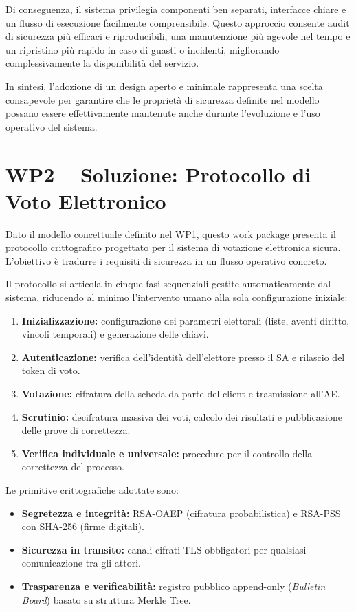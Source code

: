 \documentclass[12pt,a4paper]{article}
\begin{document}
Di conseguenza, il sistema privilegia componenti ben separati, interfacce chiare e un flusso di
esecuzione facilmente comprensibile. Questo approccio consente audit di sicurezza più efficaci
e riproducibili, una manutenzione più agevole nel tempo e un ripristino più rapido in caso di
guasti o incidenti, migliorando complessivamente la disponibilità del servizio.

In sintesi, l'adozione di un design aperto e minimale rappresenta una scelta consapevole per
garantire che le proprietà di sicurezza definite nel modello possano essere effettivamente
mantenute anche durante l'evoluzione e l'uso operativo del sistema.

\newpage

\section{WP2 – Soluzione: Protocollo di Voto Elettronico}

Dato il modello concettuale definito nel WP1, questo work package presenta il protocollo
crittografico progettato per il sistema di votazione elettronica sicura. L'obiettivo è
tradurre i requisiti di sicurezza in un flusso operativo concreto.

Il protocollo si articola in cinque fasi sequenziali gestite automaticamente dal sistema,
riducendo al minimo l'intervento umano alla sola configurazione iniziale:

\begin{enumerate}
  \item \textbf{Inizializzazione:} configurazione dei parametri elettorali (liste, aventi diritto,
    vincoli temporali) e generazione delle chiavi.
  \item \textbf{Autenticazione:} verifica dell'identità dell'elettore presso il SA e rilascio del
    token di voto.
  \item \textbf{Votazione:} cifratura della scheda da parte del client e trasmissione all'AE.
  \item \textbf{Scrutinio:} decifratura massiva dei voti, calcolo dei risultati e pubblicazione
    delle prove di correttezza.
  \item \textbf{Verifica individuale e universale:} procedure per il controllo della correttezza
    del processo.
\end{enumerate}

Le primitive crittografiche adottate sono:
\begin{itemize}
  \item \textbf{Segretezza e integrità:} RSA-OAEP (cifratura probabilistica) e RSA-PSS
    con SHA-256 (firme digitali).
  \item \textbf{Sicurezza in transito:} canali cifrati TLS obbligatori per qualsiasi
    comunicazione tra gli attori.
  \item \textbf{Trasparenza e verificabilità:} registro pubblico append-only
    (\textit{Bulletin Board}) basato su struttura Merkle Tree.
\end{itemize}
\end{document}
